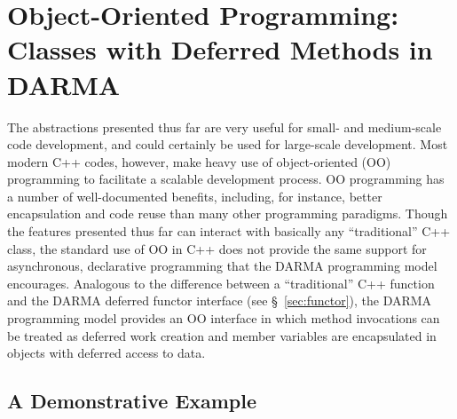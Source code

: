 
\lstMakeShortInline[style=CppCodeInlineStyle]{\|}

\section{Object-Oriented Programming:  Classes with Deferred Methods in DARMA}

The abstractions presented thus far are very useful for small-
and medium-scale code development, and could certainly be used for
large-scale development.  Most modern C++ codes, however, make heavy use of
object-oriented (OO) programming to facilitate a scalable development process. 
OO programming has a number of well-documented benefits, including, for
instance, better encapsulation and code reuse than many other programming
paradigms.  Though the features presented thus far can interact with basically
any ``traditional'' C++ class, the standard use of OO in C++ does not provide
the same support for asynchronous, declarative programming that the DARMA
programming model encourages.  Analogous to the difference between a
``traditional'' C++ function and the DARMA deferred functor interface (see
\S~\ref{sec:functor}), the DARMA programming model provides an OO interface in
which method invocations can be treated as deferred work creation and member
variables are encapsulated in \ahandleT objects with deferred access to
data.

\subsection{A Demonstrative Example}
\label{subsec:oodemon}

